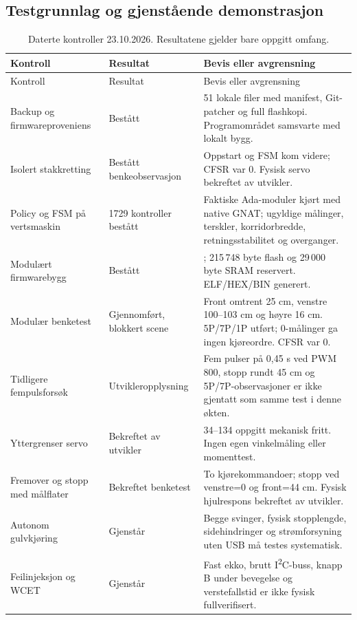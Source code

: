 \subsection{Testgrunnlag og gjenstående demonstrasjon}
\begin{longtable}{@{}P{36mm}P{39mm}P{71mm}@{}}
\caption{Daterte kontroller 23.10.2026. Resultatene gjelder bare oppgitt omfang.}
\label{tab:tester23}\\
\toprule Kontroll & Resultat & Bevis eller avgrensning\\\midrule
\endfirsthead
\toprule Kontroll & Resultat & Bevis eller avgrensning\\\midrule
\endhead
Backup og firmwareproveniens & Bestått & 51 lokale filer med manifest, Git-patcher og full flashkopi. Programområdet samsvarte med lokalt bygg.\\
Isolert stakkretting & Bestått benkeobservasjon & Oppstart og FSM kom videre; CFSR var 0. Fysisk servo bekreftet av utvikler.\\
Policy og FSM på vertsmaskin & 1729 kontroller bestått & Faktiske Ada-moduler kjørt med native GNAT; ugyldige målinger, terskler, korridorbredde, retningsstabilitet og overganger.\\
Modulært firmwarebygg & Bestått & ; 215\,748 byte flash og 29\,000 byte SRAM reservert. ELF/HEX/BIN generert.\\
Modulær benketest & Gjennomført, blokkert scene & Front omtrent 25 cm, venstre 100--103 cm og høyre 16 cm. 5P/7P/1P utført; 0-målinger ga ingen kjøreordre. CFSR var 0.\\
Tidligere fempulsforsøk & Utvikleropplysning & Fem pulser på 0,45 s ved PWM 800, stopp rundt 45 cm og 5P/7P-observasjoner er ikke gjentatt som samme test i denne økten.\\
Yttergrenser servo & Bekreftet av utvikler & 34--134\textdegree{} oppgitt mekanisk fritt. Ingen egen vinkelmåling eller momenttest.\\
Fremover og stopp med målflater & Bekreftet benketest & To kjørekommandoer; stopp ved venstre=0 og front=44 cm. Fysisk hjulrespons bekreftet av utvikler.\\
Autonom gulvkjøring & Gjenstår & Begge svinger, fysisk stopplengde, sidehindringer og strømforsyning uten USB må testes systematisk.\\
Feilinjeksjon og WCET & Gjenstår & Fast ekko, brutt I\textsuperscript{2}C-buss, knapp B under bevegelse og verstefallstid er ikke fysisk fullverifisert.\\
\bottomrule
\end{longtable}

